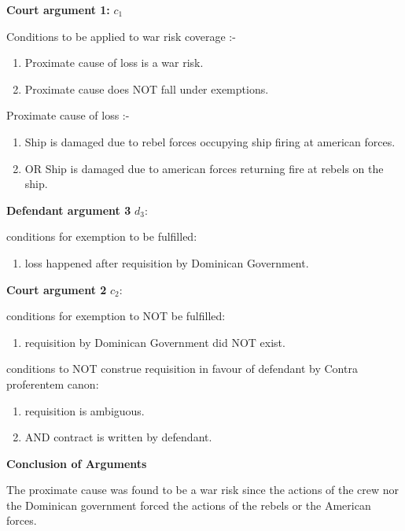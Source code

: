      \textbf{Court argument 1:} $c_1$
     
     Conditions to be applied to war risk coverage :-
     
     \begin{enumerate}
        \item Proximate cause of loss is a war risk.
        \item Proximate cause does NOT fall under exemptions.
     \end{enumerate}
                
     Proximate cause of loss :-
     
     \begin{enumerate}
        \item Ship is damaged due to rebel forces occupying ship firing at american forces.
        \item OR Ship is damaged due to american forces returning fire at rebels on the ship.
     \end{enumerate}
                
     \textbf{Defendant argument 3} $d_3$:
     
     conditions for exemption to be fulfilled:
         \begin{enumerate}
             \item loss happened after requisition by Dominican Government.
         \end{enumerate}
     
     
    \textbf{Court argument 2} $c_2$:
    
     conditions for exemption to NOT be fulfilled:
         \begin{enumerate}
             \item requisition by Dominican Government did NOT exist.
         \end{enumerate}
     
     conditions to NOT construe requisition in favour of defendant by Contra proferentem canon:
         \begin{enumerate}
             \item requisition is ambiguous.
             \item AND contract is written by defendant.
         \end{enumerate}

\textbf{Conclusion of Arguments}

The proximate cause was found to be a war risk since the actions of the crew nor the Dominican government forced the actions of the rebels or the American forces.

